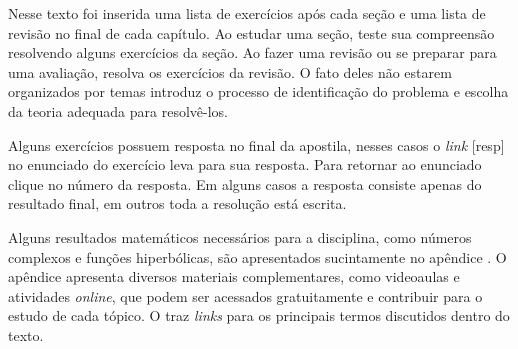 Nesse texto foi inserida uma lista de exercícios após cada seção e uma lista de revisão
no final de cada capítulo. Ao estudar uma seção, teste sua compreensão resolvendo alguns
exercícios da seção. Ao fazer uma revisão ou se preparar para uma avaliação, resolva
os exercícios da revisão. O fato deles não estarem organizados por temas introduz o
processo de identificação do problema e escolha da teoria adequada para resolvê-los.

Alguns exercícios possuem resposta no final da apostila, nesses casos o
\textit{link} \textcolor{cpLinks}{[resp]} no enunciado do exercício
leva para sua resposta. Para retornar ao enunciado clique no número da resposta.
Em alguns casos a resposta consiste apenas do resultado final, em outros toda a
resolução está escrita.

Alguns resultados matemáticos necessários para a disciplina, como números complexos e
funções hiperbólicas, são apresentados sucintamente no apêndice
.
O apêndice  apresenta diversos materiais complementares,
como videoaulas e atividades \textit{online}, que podem ser acessados gratuitamente
e contribuir para o estudo de cada tópico.
O  traz \textit{links} para os principais termos
discutidos dentro do texto.

